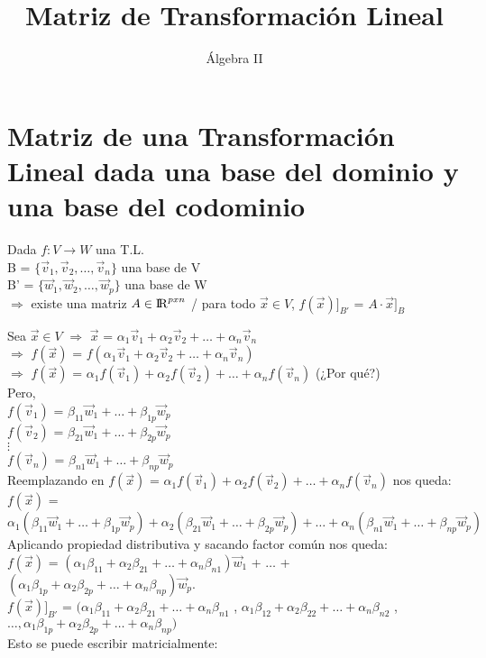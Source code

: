 \documentclass[11pt]{article}
\title{Matriz de Transformación Lineal}
\author{Álgebra II}
\date{\vspace{-5ex}}
\begin{document}
\maketitle{}
\section{Matriz de una Transformación Lineal dada una
base del dominio y una base del codominio}
Dada $f : V \rightarrow W$ una T.L. \\
B = $\{\vec{v}_1 , \vec{v}_2, \hdots, \vec{v}_n\}$ una base de V \\
B' = $\{\vec{w}_1, \vec{w}_2, \hdots, \vec{w}_p\}$ una base de W\\
$\Rightarrow$ existe una matriz $A \in {\rm I\!R}^{pxn}$  / para todo $\vec{x} \in V$, $f(\vec{x})]_{B'}$ = $A \cdot \vec{x}]_B$

\noindent
Sea $\vec{x} \in V$ $\Rightarrow$ $\vec{x}$ = $\alpha_1 \vec{v}_1 + \alpha_2 \vec{v}_2 + \hdots + \alpha_n \vec{v}_n$ \\
$\Rightarrow$ $f(\vec{x})$ = $f(\alpha_1 \vec{v}_1 + \alpha_2 \vec{v}_2 + \hdots + \alpha_n \vec{v}_n)$ \\
$\Rightarrow$ $f(\vec{x})$ = $\alpha_1 f(\vec{v}_1) + \alpha_2 f(\vec{v}_2) + \hdots + \alpha_n f(\vec{v}_n)$ (¿Por qué?)\\
Pero, \\
$f(\vec{v}_1)$ = $\beta_{11} \vec{w}_1 + \hdots + \beta_{1p} \vec{w}_p$\\
$f(\vec{v}_2)$ = $\beta_{21} \vec{w}_1 + \hdots + \beta_{2p} \vec{w}_p$\\
$\vdots$ \\
$f(\vec{v}_n)$ = $\beta_{n1} \vec{w}_1 + \hdots + \beta_{np} \vec{w}_p$ \\
Reemplazando en $f(\vec{x})$ = $\alpha_1 f(\vec{v}_1) + \alpha_2 f(\vec{v}_2) + \hdots + \alpha_n f(\vec{v}_n)$ nos queda: \\
$f(\vec{x})$ = 
$\alpha_1 (\beta_{11} \vec{w}_1 + \hdots + \beta_{1p} \vec{w}_p) 
+ \alpha_2 (\beta_{21} \vec{w}_1 + \hdots + \beta_{2p} \vec{w}_p) 
+ \hdots 
+ \alpha_n (\beta_{n1} \vec{w}_1 + \hdots + \beta_{np} \vec{w}_p)$ \\
Aplicando propiedad distributiva y sacando factor común nos queda: \\
$f(\vec{x})$ =
$(\alpha_1 \beta_{11} + \alpha_2 \beta_{21} + \hdots + \alpha_n \beta_{n1}) \vec{w}_1$ + $\hdots$ +  $(\alpha_1 \beta_{1p} + \alpha_2 \beta_{2p} + \hdots + \alpha_n \beta_{np}) \vec{w}_p$. \\
$f(\vec{x})]_{B'}$ = $(\alpha_1 \beta_{11} + \alpha_2 \beta_{21} + \hdots + \alpha_n \beta_{n1}$ , $\alpha_1 \beta_{12} + \alpha_2 \beta_{22} + \hdots + \alpha_n \beta_{n2}$ , $\hdots , \alpha_1 \beta_{1p} + \alpha_2 \beta_{2p} + \hdots + \alpha_n \beta_{np})$ \\
Esto se puede escribir matricialmente: \\
\end{document}
